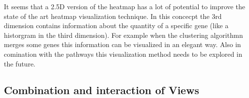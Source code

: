 It seems that a 2.5D version of the heatmap has a lot of potential to improve the state of the art heatmap visualization technique.
In this concecpt the 3rd dimension contains information about the quantity of a specific gene (like a historgram in the third dimension). For example when the clustering algorithmn merges some genes this information can be visualized in an elegant way.
Also in comination with the pathways this visualization method needs to be explored in the future.

\subsection{Combination and interaction of Views}




